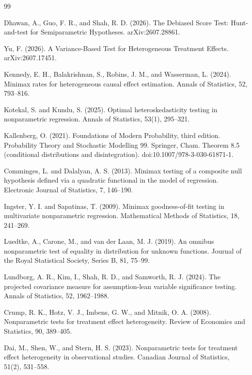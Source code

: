 \documentclass{article}
\begin{document}
\begin{thebibliography}{99}

   Dhawan, A., Guo, F. R., and Shah, R. D. (2026). The Debiased Score Test: Hunt-and-test for Semiparametric Hypotheses. arXiv:2607.28861.

   Yu, F. (2026). A Variance-Based Test for Heterogeneous Treatment Effects. arXiv:2607.17451.

   Kennedy, E. H., Balakrishnan, S., Robins, J. M., and Wasserman, L. (2024). Minimax rates for heterogeneous causal effect estimation. Annals of Statistics, 52, 793--816.

   Kotekal, S. and Kundu, S. (2025). Optimal heteroskedasticity testing in nonparametric regression. Annals of Statistics, 53(1), 295--321.

   Kallenberg, O. (2021). Foundations of Modern Probability, third edition. Probability Theory and Stochastic Modelling 99. Springer, Cham. Theorem 8.5 (conditional distributions and disintegration). doi:10.1007/978-3-030-61871-1.

   Comminges, L. and Dalalyan, A. S. (2013). Minimax testing of a composite null hypothesis defined via a quadratic functional in the model of regression. Electronic Journal of Statistics, 7, 146--190.

   Ingster, Y. I. and Sapatinas, T. (2009). Minimax goodness-of-fit testing in multivariate nonparametric regression. Mathematical Methods of Statistics, 18, 241--269.

   Luedtke, A., Carone, M., and van der Laan, M. J. (2019). An omnibus nonparametric test of equality in distribution for unknown functions. Journal of the Royal Statistical Society, Series B, 81, 75--99.

   Lundborg, A. R., Kim, I., Shah, R. D., and Samworth, R. J. (2024). The projected covariance measure for assumption-lean variable significance testing. Annals of Statistics, 52, 1962--1988.

   Crump, R. K., Hotz, V. J., Imbens, G. W., and Mitnik, O. A. (2008). Nonparametric tests for treatment effect heterogeneity. Review of Economics and Statistics, 90, 389--405.

   Dai, M., Shen, W., and Stern, H. S. (2023). Nonparametric tests for treatment effect heterogeneity in observational studies. Canadian Journal of Statistics, 51(2), 531--558.


\end{thebibliography}
\end{document}
